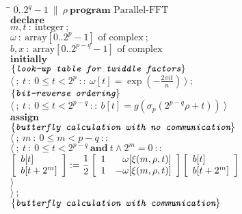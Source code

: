 \begin{tabbing}
	\quad\=\quad\=\quad\=\quad\=\kill
	$0..2^q-1\ \|\ \rho\ \mathbf{program} \textrm{ Parallel-FFT}$\\
	$\mathbf{declare}$\\
		\>$m,t\ :\ \textrm{integer}\ ;$\\
		\>$\omega\ :\ \mathrm{array}[0..2^{p}-1] \textrm{ of complex}\ ;$\\
		\>$b,x\ :\ \mathrm{array}[0..2^{p-q}-1] \textrm{ of complex}$\\
	$\mathbf{initially}$\\
		\>$\color{MidnightBlue}\curlb{\textit{\ttfamily look-up table for twiddle factors}}$\\
		\>$\langle \ ;\ t\ :\ 0\leq t<2^p\ ::\ \omega[t] = \exp(-\frac{2\pi it}{n})\ \rangle\ ;$\\
		\>$\color{MidnightBlue}\curlb{\textit{\ttfamily bit-reverse ordering}}$\\
		\>$\langle \ ;\ t\ :\ 0\leq t<2^{p-q}\ ::\ b[t] = g(\sigma_p(2^{p-q}\rho + t))\ \rangle$\\
	$\mathbf{assign}$\\
		\>$\color{MidnightBlue}\curlb{\textit{\ttfamily butterfly calculation with no communication}}$\\
		\>$\langle \ ;\ m\ :\ 0\leq m<p-q\ ::$\\
			\>\>$\langle \ ;\ t\ :\ 0\leq t<2^{p-q}\ \mathbf{and}\ t\wedge 2^m=0\ ::$\\
				\>\>\>$\boxb{ \begin{array}{l} b[t] \\ b[t+2^m] \end{array} } := \dfrac{1}{2} \boxb{ \begin{array}{lr} 1 & \omega[\xi(m,\rho, t)] \\ 1 & -\omega[\xi(m,\rho, t)] \end{array} }\boxb{ \begin{array}{l} b[t] \\ b[t+2^m] \end{array} }$\\
			\>\>$\rangle$\\
		\>$\rangle\ ;$\\
		\>$\color{MidnightBlue}\curlb{\textit{\ttfamily butterfly calculation with communication}}$\\

\end{tabbing}

